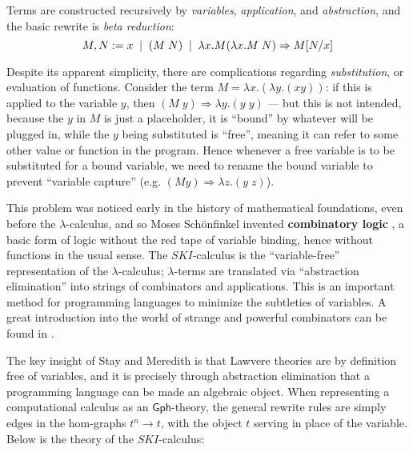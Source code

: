 \documentclass{amsart}
\theoremstyle{definition}
\newcommand{\Gph}{\mathsf{Gph}}
\begin{document}
Terms are constructed recursively by \textit{variables}, \textit{application}, and \textit{abstraction}, and the basic rewrite is \textit{beta reduction}: 
\[ M,N := x \;\; | \;\; (M\; N) \;\; | \;\; \lambda x.M$$ $$(\lambda x.M\; N) \Rightarrow M[N/x] \]

Despite its apparent simplicity, there are complications regarding \textit{substitution}, or evaluation of functions. Consider the term $M = \lambda x.(\lambda y.(xy))$: if this is applied to the variable $y$, then $(M\; y) \Rightarrow \lambda y.(y\; y)$ --- but this is not intended, because the $y$ in $M$ is just a placeholder, it is ``bound'' by whatever will be plugged in, while the $y$ being substituted is ``free'', meaning it can refer to some other value or function in the program. Hence whenever a free variable is to be substituted for a bound variable, we need to rename the bound variable to prevent ``variable capture'' (e.g. $(M y) \Rightarrow \lambda z.(y\; z)$).

This problem was noticed early in the history of mathematical foundations, even before the $\lambda$-calculus, and so Moses Sch\"onfinkel invented \textbf{combinatory logic} \cite{combs}, a basic form of logic without the red tape of variable binding, hence without functions in the usual sense. The $SKI$-calculus is the ``variable-free'' representation of the $\lambda$-calculus; $\lambda$-terms are translated via ``abstraction elimination'' into strings of combinators and applications. This is an important method for programming languages to minimize the subtleties of variables. A great introduction into the world of strange and powerful combinators can be found in \cite{tmam}.

The key insight of Stay and Meredith \cite{roswelt} is that Lawvere theories are by definition free of variables, and it is precisely through abstraction elimination that a programming language can be made an algebraic object. When representing a computational calculus as an $\Gph$-theory, the general rewrite rules are simply edges in the hom-graphs $t^n \to t$, with the object $t$ serving in place of the variable. Below is the theory of the $SKI$-calculus:
\end{document}

